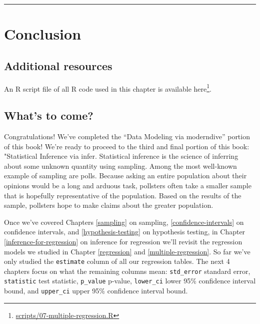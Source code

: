\documentclass[12pt, krantz2,]{krantz}
\renewcommand{\href}[2]{#2\footnote{\url{#1}}}
\begin{document}
\begin{center}\rule{0.5\linewidth}{\linethickness}\end{center}

\hypertarget{conclusion-5}{%
\section{Conclusion}\label{conclusion-5}}

\hypertarget{additional-resources-4}{%
\subsection{Additional resources}\label{additional-resources-4}}

An R script file of all R code used in this chapter is available \href{scripts/07-multiple-regression.R}{here}.

\hypertarget{whats-to-come-5}{%
\subsection{What's to come?}\label{whats-to-come-5}}

Congratulations! We've completed the ``Data Modeling via moderndive'' portion of this book! We're ready to proceed to the third and final portion of this book: "Statistical Inference via infer. Statistical inference is the science of inferring about some unknown quantity using sampling. Among the most well-known example of sampling are polls. Because asking an entire population about their opinions would be a long and arduous task, pollsters often take a smaller sample that is hopefully representative of the population. Based on the results of the sample, pollsters hope to make claims about the greater population.

Once we've covered Chapters \ref{sampling} on sampling, \ref{confidence-intervals} on confidence intervals, and \ref{hypothesis-testing} on hypothesis testing, in Chapter \ref{inference-for-regression} on inference for regression we'll revisit the regression models we studied in Chapter \ref{regression} and \ref{multiple-regression}. So far we've only studied the \texttt{estimate} column of all our regression tables. The next 4 chapters focus on what the remaining columns mean: \texttt{std\_error} standard error, \texttt{statistic} test statistic, \texttt{p\_value} p-value, \texttt{lower\_ci} lower 95\% confidence interval bound, and \texttt{upper\_ci} upper 95\% confidence interval bound.
\end{document}
